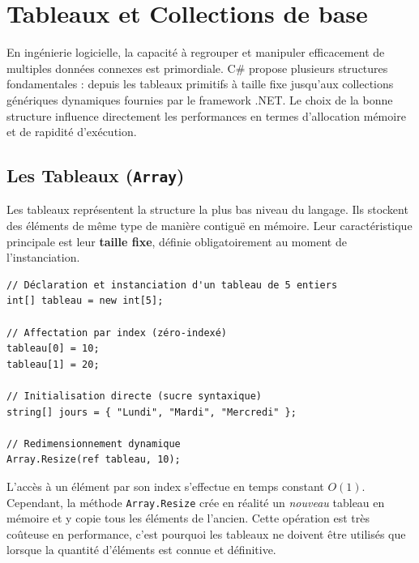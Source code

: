 
\newpage
\section{Tableaux et Collections de base}

En ingénierie logicielle, la capacité à regrouper et manipuler efficacement de multiples données connexes est primordiale. C\# propose plusieurs structures fondamentales : depuis les tableaux primitifs à taille fixe jusqu'aux collections génériques dynamiques fournies par le framework .NET. Le choix de la bonne structure influence directement les performances en termes d'allocation mémoire et de rapidité d'exécution.

\subsection{Les Tableaux (\texttt{Array})}
Les tableaux représentent la structure la plus bas niveau du langage. Ils stockent des éléments de même type de manière contiguë en mémoire. Leur caractéristique principale est leur \textbf{taille fixe}, définie obligatoirement au moment de l'instanciation.

\begin{lstlisting}[style=csharpstyle]
// Déclaration et instanciation d'un tableau de 5 entiers
int[] tableau = new int[5];

// Affectation par index (zéro-indexé)
tableau[0] = 10;
tableau[1] = 20;

// Initialisation directe (sucre syntaxique)
string[] jours = { "Lundi", "Mardi", "Mercredi" };

// Redimensionnement dynamique
Array.Resize(ref tableau, 10);
\end{lstlisting}

L'accès à un élément par son index s'effectue en temps constant $O(1)$. Cependant, la méthode \texttt{Array.Resize} crée en réalité un \textit{nouveau} tableau en mémoire et y copie tous les éléments de l'ancien. Cette opération est très coûteuse en performance, c'est pourquoi les tableaux ne doivent être utilisés que lorsque la quantité d'éléments est connue et définitive.

